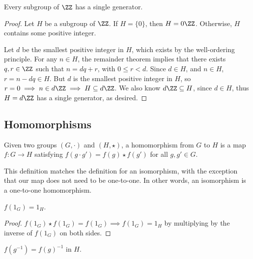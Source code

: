 \begin{theorem}
\thmlabel

Every subgroup of $\ZZ$ has a single generator. 
\end{theorem}

\begin{proof}

Let $H$ be a subgroup of $\ZZ$. If $H = \{0\}$, then $H = 0\ZZ$. Otherwise, $H$ contains some positive integer. 

Let $d$ be the smallest positive integer in $H$, which exists by the well-ordering principle. For any $n\in H$, the remainder theorem implies that there exists $q,r\in \ZZ$ such that $n = dq+r$, with $0\leq r < d$. Since $d\in H$, and $n\in H$, $r = n-dq\in H$. But $d$ is the smallest positive integer in $H$, so $r=0\implies n\in d\ZZ \implies H\subseteq d\ZZ$. We also know $d\ZZ\subseteq H$, since $d\in H$, thus $H = d\ZZ$ has a single generator, as desired. 
\end{proof}

\subsection{Homomorphisms}

\begin{definition}

Given two groups $(G, \cdot)$ and $(H, \star)$, a \ac{homomorphism} from $G$ to $H$ is a map $f:G\rightarrow H$ satisfying $f(g\cdot g') = f(g)\star f(g')$ for all $g,g'\in G$. 
\end{definition}

This definition matches the definition for an isomorphism, with the exception that our map does not need to be one-to-one. In other words, an isomorphism is a one-to-one homomorphism. 

\begin{theorem}
\proplabel

$f(1_G) = 1_H$.
\end{theorem}

\begin{proof}
$f(1_G)\star f(1_G) = f(1_G)\implies f(1_G) = 1_H$ by multiplying by the inverse of $f(1_G)$ on both sides. 
\end{proof}

\begin{theorem}
\proplabel

$f(g^{-1}) = f(g)^{-1}$ in $H$. 
\end{theorem}

